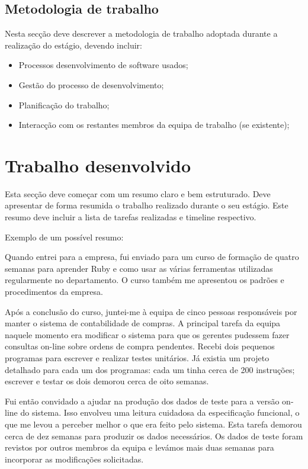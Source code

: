 \documentclass{article}
\begin{document}
\subsection{Metodologia de trabalho}
Nesta secção deve descrever a metodologia de trabalho adoptada durante a realização do estágio, devendo incluir:

\begin{itemize}
    
\item Processos desenvolvimento de software usados;
\item Gestão do processo de desenvolvimento;
\item Planificação do trabalho;
\item Interacção com os restantes membros da equipa de trabalho (se existente);

\end{itemize}

\cleardoublepage
\section{Trabalho desenvolvido}
Esta secção deve começar com um resumo claro e bem estruturado. Deve apresentar de forma resumida o trabalho realizado durante o seu estágio. Este resumo deve incluir a lista de tarefas realizadas e timeline respectivo.

Exemplo de um possível resumo:

Quando entrei para a empresa, fui enviado para um curso de formação de quatro semanas para aprender Ruby e como usar as várias ferramentas utilizadas regularmente no departamento. O curso também me apresentou os padrões e procedimentos da empresa.

Após a conclusão do curso, juntei-me à equipa de cinco pessoas responsáveis por manter o sistema de contabilidade de compras. A principal tarefa da equipa naquele momento era modificar o sistema para que os gerentes pudessem fazer consultas on-line sobre ordens de compra pendentes. Recebi dois pequenos programas para escrever e realizar testes unitários. Já existia um projeto detalhado para cada um dos programas: cada um tinha cerca de 200 instruções; escrever e testar os dois demorou cerca de oito semanas.

Fui então convidado a ajudar na produção dos dados de teste para a versão on-line do sistema. Isso envolveu uma leitura cuidadosa da especificação funcional, o que me levou a perceber melhor o que era feito pelo sistema. Esta tarefa demorou cerca de dez semanas para produzir os dados necessários. Os dados de teste foram revistos por outros membros da equipa e levámos mais duas semanas para incorporar as modificações solicitadas.
\end{document}
